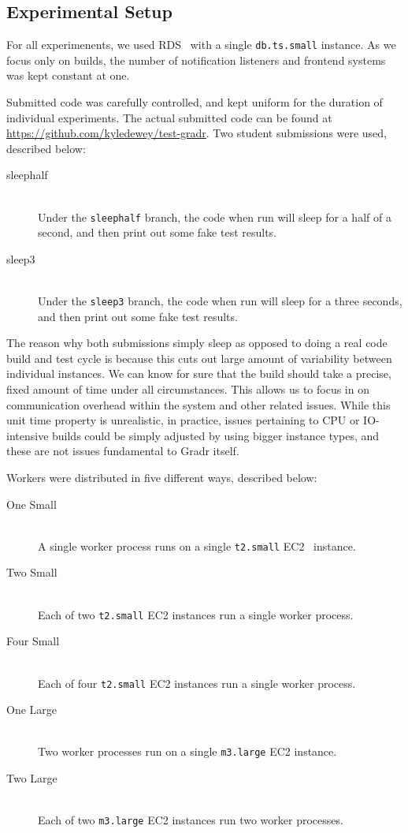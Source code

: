 \documentclass{scrartcl}
\begin{document}
\subsection{Experimental Setup}
For all experimenents, we used RDS~\cite{rds} with a single \texttt{db.ts.small} instance.
As we focus only on builds, the number of notification listeners and frontend systems was kept constant at one.

Submitted code was carefully controlled, and kept uniform for the duration of individual experiments.
The actual submitted code can be found at \url{https://github.com/kyledewey/test-gradr}.
Two student submissions were used, described below:
\begin{description}
  \item[sleephalf] \hfill \\
    Under the \texttt{sleephalf} branch, the code when run will sleep for a half of a second, and then print out some fake test results.

  \item[sleep3] \hfill \\
    Under the \texttt{sleep3} branch, the code when run will sleep for a three seconds, and then print out some fake test results.
\end{description}

The reason why both submissions simply sleep as opposed to doing a real code build and test cycle is because this cuts out large amount of variability between individual instances.
We can know for sure that the build should take a precise, fixed amount of time under all circumstances.
This allows us to focus in on communication overhead within the system and other related issues.
While this unit time property is unrealistic, in practice, issues pertaining to CPU or IO-intensive builds could be simply adjusted by using bigger instance types, and these are not issues fundamental to Gradr itself.

Workers were distributed in five different ways, described below:
\begin{description}
  \item[One Small] \hfill \\
    A single worker process runs on a single \texttt{t2.small} EC2~\cite{ec2} instance.

  \item[Two Small] \hfill \\
    Each of two \texttt{t2.small} EC2 instances run a single worker process.

  \item[Four Small] \hfill \\
    Each of four \texttt{t2.small} EC2 instances run a single worker process.

  \item[One Large] \hfill \\
    Two worker processes run on a single \texttt{m3.large} EC2 instance.

  \item[Two Large] \hfill \\
    Each of two \texttt{m3.large} EC2 instances run two worker processes.
\end{description}
\end{document}
